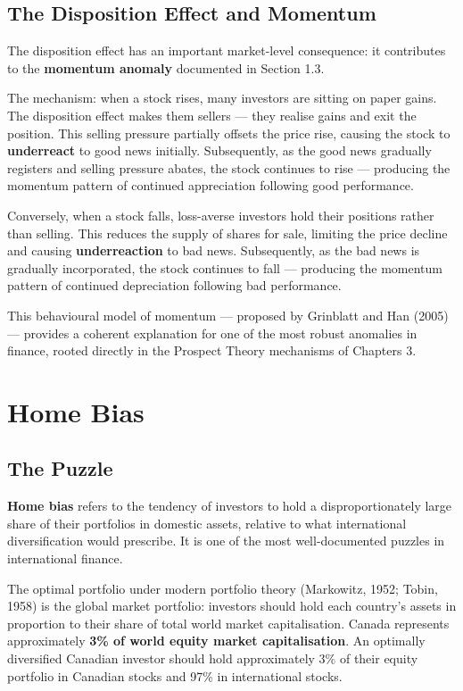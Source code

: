 \documentclass[12pt, letterpaper]{article}
\begin{document}
\subsection{The Disposition Effect and Momentum}


The disposition effect has an important market-level consequence: it contributes to the \textbf{momentum anomaly} documented in Section 1.3.

The mechanism: when a stock rises, many investors are sitting on paper gains. The disposition effect makes them sellers --- they realise gains and exit the position. This selling pressure partially offsets the price rise, causing the stock to \textbf{underreact} to good news initially. Subsequently, as the good news gradually registers and selling pressure abates, the stock continues to rise --- producing the momentum pattern of continued appreciation following good performance.

Conversely, when a stock falls, loss-averse investors hold their positions rather than selling. This reduces the supply of shares for sale, limiting the price decline and causing \textbf{underreaction} to bad news. Subsequently, as the bad news is gradually incorporated, the stock continues to fall --- producing the momentum pattern of continued depreciation following bad performance.

This behavioural model of momentum --- proposed by Grinblatt and Han (2005) --- provides a coherent explanation for one of the most robust anomalies in finance, rooted directly in the Prospect Theory mechanisms of Chapters 3.

\medskip


\section{Home Bias}



\subsection{The Puzzle}


\textbf{Home bias} refers to the tendency of investors to hold a disproportionately large share of their portfolios in domestic assets, relative to what international diversification would prescribe. It is one of the most well-documented puzzles in international finance.

The optimal portfolio under modern portfolio theory (Markowitz, 1952; Tobin, 1958) is the global market portfolio: investors should hold each country's assets in proportion to their share of total world market capitalisation. Canada represents approximately \textbf{3\% of world equity market capitalisation}. An optimally diversified Canadian investor should hold approximately 3\% of their equity portfolio in Canadian stocks and 97\% in international stocks.
\end{document}
